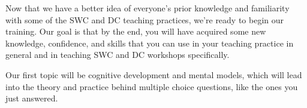Now that we have a better idea of everyone's prior knowledge and
familiarity with some of the SWC and DC teaching practices, we're
ready to begin our training. Our goal is that by the end, you will
have acquired some new knowledge, confidence, and skills that you can
use in your teaching practice in general and in teaching SWC and DC
workshops specifically.

Our first topic will be cognitive development and mental models,
which will lead into the theory and practice behind multiple choice
questions, like the ones you just answered.

